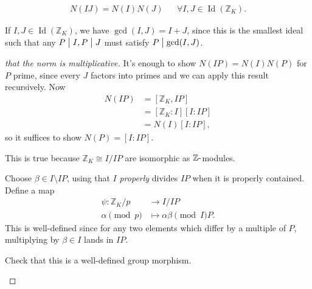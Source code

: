 \begin{theorem}

\begin{align*}
N(IJ) = N(I) N(J) && \forall I, J \in \operatorname{Id}({\mathbb{Z}}_K)
.\end{align*}

\end{theorem}

\begin{remark}

If \(I, J\in \operatorname{Id}({\mathbb{Z}}_K)\), we have
\(\gcd(I, J) = I+J\), since this is the smallest ideal such that any
\(P\bigm|I, P\bigm|J\) must satisfy \(P\bigm|\gcd(I, J)\).

\end{remark}

\begin{proof}[that the norm is multiplicative]

It's enough to show \(N(IP) = N(I) N(P)\) for \(P\) prime, since every
\(J\) factors into primes and we can apply this result recursively. Now
\begin{align*}
N(IP) 
&= [{\mathbb{Z}}_K, IP] \\
&= [{\mathbb{Z}}_K: I] [I : IP] \\
&= N(I) [I: IP]
,\end{align*}
so it suffices to show \(N(P) = [I: IP]\).

\begin{claim}

This is true because \({\mathbb{Z}}_K \cong I/IP\) are isomorphic as
\({\mathbb{Z}}{\hbox{-}}\)modules.

\end{claim}

Choose \(\beta \in I\setminus IP\), using that \(I\) \emph{properly}
divides \(IP\) when it is properly contained. Define a map
\begin{align*}
\psi: {\mathbb{Z}}_K/p &\to I/IP \\
\alpha \pmod p  &\mapsto \alpha \beta \pmod IP
.\end{align*}
This is well-defined since for any two elements which differ by a
multiple of \(P\), multiplying by \(\beta \in I\) lands in \(IP\).

\begin{exercise}[?]

Check that this is a well-defined group morphism.

\end{exercise}


\end{proof}
